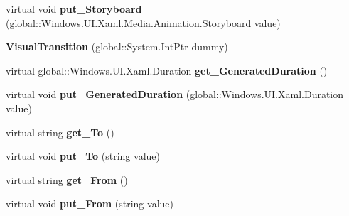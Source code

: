 \begin{DoxyCompactItemize}
\item 
\mbox{\label{class_windows_1_1_u_i_1_1_xaml_1_1_visual_transition_a84345f3db3f81606783b0b0f12f011dd}} 
virtual void {\bfseries put\+\_\+\+Storyboard} (global\+::\+Windows.\+U\+I.\+Xaml.\+Media.\+Animation.\+Storyboard value)
\item 
\mbox{\label{class_windows_1_1_u_i_1_1_xaml_1_1_visual_transition_a8e9584c6562711665f737ddc44600c07}} 
{\bfseries Visual\+Transition} (global\+::\+System.\+Int\+Ptr dummy)
\item 
\mbox{\label{class_windows_1_1_u_i_1_1_xaml_1_1_visual_transition_afb0659e34cd42d916c1086d04558a288}} 
virtual global\+::\+Windows.\+U\+I.\+Xaml.\+Duration {\bfseries get\+\_\+\+Generated\+Duration} ()
\item 
\mbox{\label{class_windows_1_1_u_i_1_1_xaml_1_1_visual_transition_a9425580c95693c7ee3d33464e68ce83f}} 
virtual void {\bfseries put\+\_\+\+Generated\+Duration} (global\+::\+Windows.\+U\+I.\+Xaml.\+Duration value)
\item 
\mbox{\label{class_windows_1_1_u_i_1_1_xaml_1_1_visual_transition_a0b343e8c15ba3f404cb2f2152e2af0fb}} 
virtual string {\bfseries get\+\_\+\+To} ()
\item 
\mbox{\label{class_windows_1_1_u_i_1_1_xaml_1_1_visual_transition_aa76ac64a1c186e375fd07fbef846cefd}} 
virtual void {\bfseries put\+\_\+\+To} (string value)
\item 
\mbox{\label{class_windows_1_1_u_i_1_1_xaml_1_1_visual_transition_a9aa7c36d0dc60308cfeda62679c8e084}} 
virtual string {\bfseries get\+\_\+\+From} ()
\item 
\mbox{\label{class_windows_1_1_u_i_1_1_xaml_1_1_visual_transition_af379d21f8a469ce2c38b93f7b387d5f3}} 
virtual void {\bfseries put\+\_\+\+From} (string value)
\item 

\end{DoxyCompactItemize}
